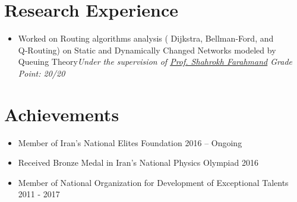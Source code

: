 \documentclass[11pt,a4paper,sans]{moderncv}        %
\begin{document}

\section{Research Experience}
\begin{itemize}
    \item {Worked on Routing algorithms analysis ( Dijkstra, Bellman‑Ford, and Q‑Routing) on Static and Dynamically Changed Networks modeled by Queuing Theory\newline \textit{Under the supervision of \href{https://scholar.google.nl/citations?user=wulBErEAAAAJ&hl=en}{{Prof. Shahrokh Farahmand}} \newline Grade Point: 20/20} }
\end{itemize}

\section{Achievements}
\begin{itemize}
    \item {Member of Iran’s National Elites Foundation  \hfill{2016 – Ongoing}}
    \item {Received Bronze Medal in Iran’s National Physics Olympiad \hfill{2016}}
    \item {Member of National Organization for Development of Exceptional Talents \hfill{2011 - 2017}}
\end{itemize}
\end{document}
